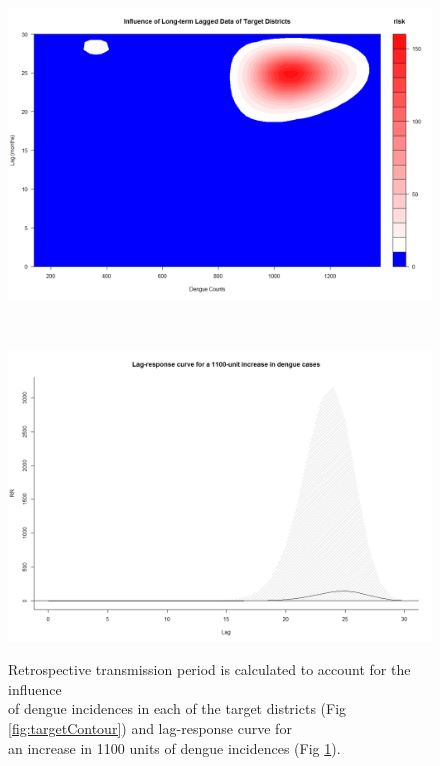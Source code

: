 \documentclass{bmcart}
\begin{document}


\begin{figure}[htbp]
	\centering
	\begin{minipage}{0.8\textwidth}
		\centering
		\includegraphics[width= 1.1\textwidth]{8-LongLagContour}
		\subcaption{}
		\label{fig:targetContour}
	\end{minipage}%
	\\[1.5ex]
	\begin{minipage}{0.8\textwidth}
		\centering
		\includegraphics[width= 1.1\textwidth]{9-LagResposeLongLag}
		\subcaption{}
		\label{fig:lagPeak}
	\end{minipage}
	\caption{Retrospective transmission period is calculated to account for the influence \\ of dengue incidences in each of the target districts (Fig \ref{fig:targetContour}) and lag-response curve for \\ an increase in 1100 units of dengue incidences (Fig \ref{fig:lagPeak}).}
\end{figure}
\end{document}
